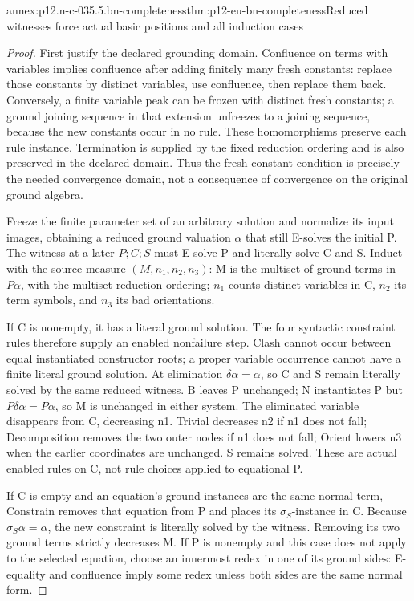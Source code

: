 \begin{annexitem}{annex:p12.n-c-035.5.bn-completeness}{thm:p12-eu-bn-completeness}{Reduced witnesses force actual basic positions and all induction cases}
\begin{proof}
First justify the declared grounding domain. Confluence on terms
with variables implies confluence after adding finitely many fresh
constants: replace those constants by distinct variables, use
confluence, then replace them back. Conversely, a finite variable
peak can be frozen with distinct fresh constants; a ground joining
sequence in that extension unfreezes to a joining sequence, because
the new constants occur in no rule. These homomorphisms preserve
each rule instance. Termination is supplied by the fixed reduction
ordering and is also preserved in the declared domain. Thus the
fresh-constant condition is precisely the needed convergence domain,
not a consequence of convergence on the original ground algebra.

Freeze the finite parameter set of an arbitrary solution and
normalize its input images, obtaining a reduced ground valuation
\(\alpha\) that still E-solves the initial P. The witness at a
later \(P;C;S\) must E-solve P and literally solve C and S.
Induct with the source measure
\((M,n_1,n_2,n_3)\): M is the multiset of ground terms in
\(P\alpha\), with the multiset reduction ordering;
\(n_1\) counts distinct variables in C, \(n_2\) its term
symbols, and \(n_3\) its bad orientations.

If C is nonempty, it has a literal ground solution. The four
syntactic constraint rules therefore supply an enabled nonfailure
step. Clash cannot occur between equal instantiated constructor
roots; a proper variable occurrence cannot have a finite literal
ground solution. At elimination \(\delta\alpha=\alpha\), so
C and S remain literally solved by the same reduced witness.
B leaves P unchanged; N instantiates P but \(P\delta\alpha=P\alpha\),
so M is unchanged in either system. The eliminated variable
disappears from C, decreasing n1. Trivial decreases n2 if n1
does not fall; Decomposition removes the two outer nodes if n1
does not fall; Orient lowers n3 when the earlier coordinates
are unchanged. S remains solved. These are actual enabled rules
on C, not rule choices applied to equational P.

If C is empty and an equation's ground instances are the same
normal term, Constrain removes that equation from P and places
its \(\sigma_S\)-instance in C. Because
\(\sigma_S\alpha=\alpha\), the new constraint is literally
solved by the witness. Removing its two ground terms strictly
decreases M. If P is nonempty and this case does not apply to
the selected equation, choose an innermost redex in one of its
ground sides: E-equality and confluence imply some redex unless
both sides are the same normal form.


\end{proof}
\end{annexitem}
